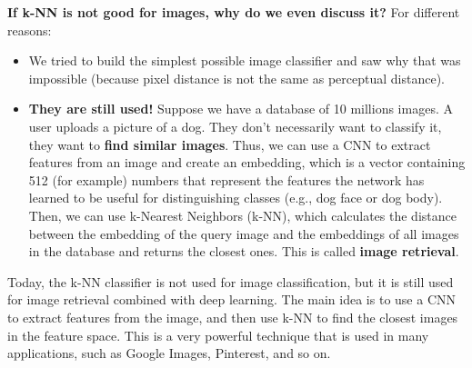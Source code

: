\highspace
\textcolor{Green3}{ \textbf{If k-NN is not good for images, why do we even discuss it?}} For different reasons:
\begin{itemize}
    \item We tried to build the simplest possible image classifier and saw why that was impossible (because pixel distance is not the same as perceptual distance).

    \item \textbf{They are still used!} Suppose we have a database of 10 millions images. A user uploads a picture of a dog. They don't necessarily want to classify it, they want to \textbf{find similar images}. Thus, we can use a CNN to extract features from an image and create an embedding, which is a vector containing 512 (for example) numbers that represent the features the network has learned to be useful for distinguishing classes (e.g., dog face or dog body). Then, we can use k-Nearest Neighbors (k-NN), which calculates the distance between the embedding of the query image and the embeddings of all images in the database and returns the closest ones. This is called \textbf{image retrieval}.
\end{itemize}
Today, the k-NN classifier is not used for image classification, but it is still used for image retrieval combined with deep learning. The main idea is to use a CNN to extract features from the image, and then use k-NN to find the closest images in the feature space. This is a very powerful technique that is used in many applications, such as Google Images, Pinterest, and so on.